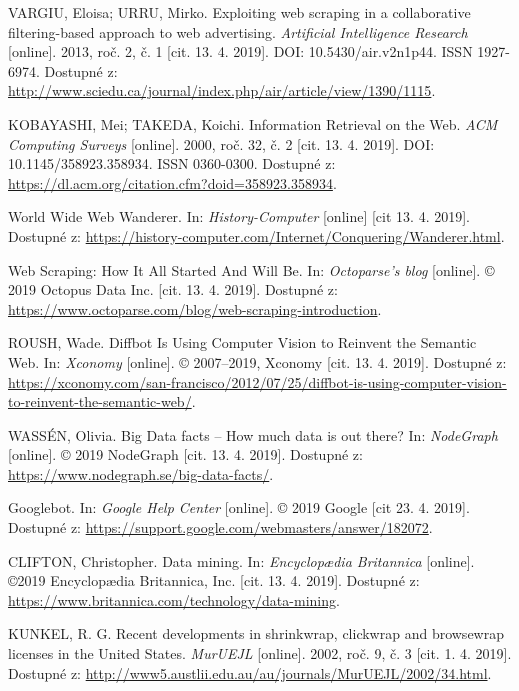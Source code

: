 \documentclass[thesis=B,czech]{FITthesis}[2012/06/26]
\begin{document}

\begin{thebibliography}{99}
	VARGIU, Eloisa; URRU, Mirko. Exploiting web scraping in a collaborative filtering-based approach to web advertising. \textit{Artificial Intelligence Research} [online]. 2013, roč. 2, č. 1 [cit. 13. 4. 2019]. DOI: 10.5430/air.v2n1p44. ISSN 1927-6974. Dostupné z: \url{http://www.sciedu.ca/journal/index.php/air/article/view/1390/1115}.
	
	KOBAYASHI, Mei; TAKEDA, Koichi. Information Retrieval on the Web. \textit{ACM Computing Surveys} [online]. 2000, roč. 32, č. 2 [cit. 13. 4. 2019]. DOI: 10.1145/358923.358934. ISSN 0360-0300. Dostupné z: \url{https://dl.acm.org/citation.cfm?doid=358923.358934}.
	
	World Wide Web Wanderer. In: \textit{History-Computer} [online] [cit 13. 4. 2019]. Dostupné z: \url{https://history-computer.com/Internet/Conquering/Wanderer.html}.
	
	Web Scraping: How It All Started And Will Be. In: \textit{Octoparse's blog} [online]. © 2019 Octopus Data Inc. [cit. 13. 4. 2019]. Dostupné z: \url{https://www.octoparse.com/blog/web-scraping-introduction}.
	
	ROUSH, Wade. Diffbot Is Using Computer Vision to Reinvent the Semantic Web. In: \textit{Xconomy} [online]. © 2007--2019, Xconomy [cit. 13. 4. 2019]. Dostupné z: \url{https://xconomy.com/san-francisco/2012/07/25/diffbot-is-using-computer-vision-to-reinvent-the-semantic-web/}.
	
	WASSÉN, Olivia. Big Data facts -- How much data is out there? In: \textit{NodeGraph} [online]. © 2019 NodeGraph [cit. 13. 4. 2019]. Dostupné z: \url{https://www.nodegraph.se/big-data-facts/}.
	
	Googlebot. In: \textit{Google Help Center} [online]. © 2019 Google [cit 23. 4. 2019]. Dostupné z: \url{https://support.google.com/webmasters/answer/182072}.
	
	CLIFTON, Christopher. Data mining. In: \textit{Encyclopædia Britannica} [online]. ©2019 Encyclopædia Britannica, Inc. [cit. 13. 4. 2019]. Dostupné z: \url{https://www.britannica.com/technology/data-mining}.
	
	KUNKEL, R. G. Recent developments in shrinkwrap, clickwrap and browsewrap licenses in the United States. \textit{MurUEJL} [online]. 2002, roč. 9, č. 3 [cit. 1. 4. 2019]. Dostupné z: \url{http://www5.austlii.edu.au/au/journals/MurUEJL/2002/34.html}.
	

\end{thebibliography}
\end{document}
